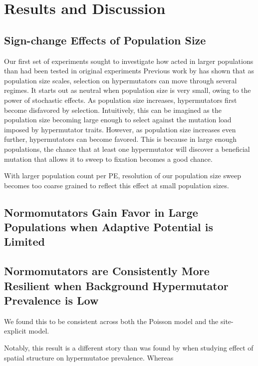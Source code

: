\section{Results and Discussion} \label{sec:results}

\subsection{Sign-change Effects of Population Size}

Our first set of experiments sought to investigate how acted in larger populations than had been tested in original experiments
Previous work by \citet{raynes2018sign} has shown that as population size scales, selection on hypermutators can move through several regimes.
It starts out as neutral when population size is very small, owing to the power of stochastic effects.
As population size increases, hypermutators first become disfavored by selection.
Intuitively, this can be imagined as the population size becoming large enough to select against the mutation load imposed by hypermutator traits.
However, as population size increases even further, hypermutators can become favored.
This is because in large enough populations, the chance that at least one hypermutator will discover a beneficial mutation that allows it to sweep to fixation becomes a good chance.

With larger population count per PE, resolution of our population size sweep becomes too coarse grained to reflect this effect at small population sizes.



\subsection{Normomutators Gain Favor in Large Populations when Adaptive Potential is Limited}



\subsection{Normomutators are Consistently More Resilient when Background Hypermutator Prevalence is Low}



We found this to be consistent across both the Poisson model and the site-explicit model.




Notably, this result is a different story than was found by \citet{raynes2019migration} when studying effect of spatial structure on hypermutatoe prevalence.
Whereas
